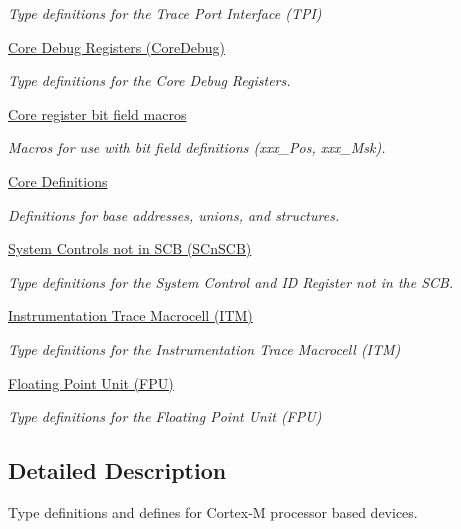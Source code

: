 \begin{DoxyCompactItemize}
\begin{DoxyCompactList}\small\item\em Type definitions for the Trace Port Interface (T\+PI) \end{DoxyCompactList}\item 
\hyperlink{group___c_m_s_i_s___core_debug}{Core Debug Registers (\+Core\+Debug)}
\begin{DoxyCompactList}\small\item\em Type definitions for the Core Debug Registers. \end{DoxyCompactList}\item 
\hyperlink{group___c_m_s_i_s__core__bitfield}{Core register bit field macros}
\begin{DoxyCompactList}\small\item\em Macros for use with bit field definitions (xxx\+\_\+\+Pos, xxx\+\_\+\+Msk). \end{DoxyCompactList}\item 
\hyperlink{group___c_m_s_i_s__core__base}{Core Definitions}
\begin{DoxyCompactList}\small\item\em Definitions for base addresses, unions, and structures. \end{DoxyCompactList}\item 
\hyperlink{group___c_m_s_i_s___s_cn_s_c_b}{System Controls not in S\+C\+B (\+S\+Cn\+S\+C\+B)}
\begin{DoxyCompactList}\small\item\em Type definitions for the System Control and ID Register not in the S\+CB. \end{DoxyCompactList}\item 
\hyperlink{group___c_m_s_i_s___i_t_m}{Instrumentation Trace Macrocell (\+I\+T\+M)}
\begin{DoxyCompactList}\small\item\em Type definitions for the Instrumentation Trace Macrocell (I\+TM) \end{DoxyCompactList}\item 
\hyperlink{group___c_m_s_i_s___f_p_u}{Floating Point Unit (\+F\+P\+U)}
\begin{DoxyCompactList}\small\item\em Type definitions for the Floating Point Unit (F\+PU) \end{DoxyCompactList}\end{DoxyCompactItemize}


\subsection{Detailed Description}
Type definitions and defines for Cortex-\/M processor based devices. 


